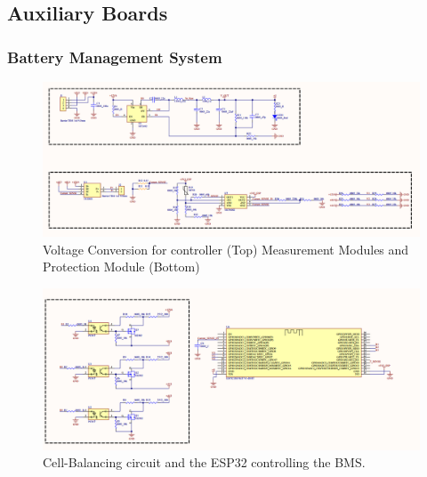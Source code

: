 \subsection{Auxiliary Boards}
\subsubsection{Battery Management System}
\begin{figure}[h!]
	\centering
	\includegraphics[scale=0.15]{Figures/HW/schem-bms-1.png}
	\caption{Voltage Conversion for controller (Top) Measurement Modules and Protection Module (Bottom)}
	\label{fig:hw-bms-schem-1}
\end{figure}

\begin{figure}[h!]
	\centering
	\includegraphics[scale=0.15]{Figures/HW/schem-bms-2.png}
	\caption{Cell-Balancing circuit and the ESP32 controlling the BMS.}
	\label{fig:hw-bms-schem-2}
\end{figure}
\newpage
